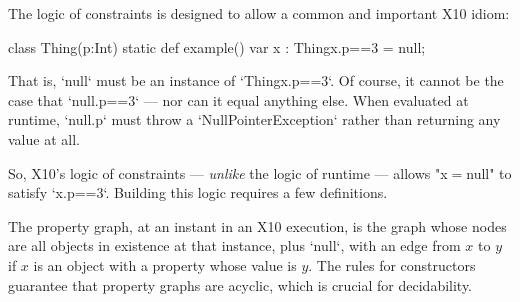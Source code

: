 The logic of constraints is designed to allow a common and important X10
idiom: 
\begin{xten}
class Thing(p:Int){}
static def example(){
   var x : Thing{x.p==3} = null;
}
\end{xten}
That is, \xcd`null` must be an instance of \xcd`Thing{x.p==3}`.  
Of course, it cannot be the case that \xcd`null.p==3` --- nor can it equal
anything else.  When evaluated at runtime, \xcd`null.p` must throw a
\xcd`NullPointerException` rather than returning any value at all.

So, X10's logic of constraints --- {\em unlike} the logic of runtime ---
allows \xcdmath"x$=$null" to satisfy \xcd`x.p==3`.  Building this logic
requires a few definitions.

The property graph, at an instant in an X10 execution, is the graph
whose nodes are all objects in existence at that instance, plus \xcd`null`,
with an edge from 
{$x$} to {$y$} if {$x$} is an object with a property whose value is {$y$}. 
The rules for constructors guarantee that property graphs are acyclic, which
is crucial for decidability.

